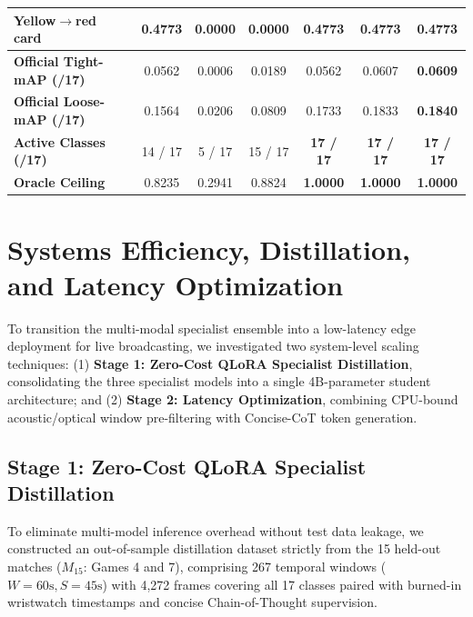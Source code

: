 \documentclass[10pt,twocolumn,letterpaper]{article}
\begin{document}
\begin{table}[t]
{\begin{tabular}{@{}lcccccc@{}}
Yellow$\to$red card & \textbf{0.4773} & 0.0000 & 0.0000 & 0.4773 & \textbf{0.4773} & \textbf{0.4773} \\
\midrule
\textbf{Official Tight-mAP (/17)} & 0.0562 & 0.0006 & 0.0189 & 0.0562 & 0.0607 & \textbf{0.0609} \\
\textbf{Official Loose-mAP (/17)} & 0.1564 & 0.0206 & 0.0809 & 0.1733 & 0.1833 & \textbf{0.1840} \\
\textbf{Active Classes (/17)} & 14 / 17 & 5 / 17 & 15 / 17 & \textbf{17 / 17} & \textbf{17 / 17} & \textbf{17 / 17} \\
\textbf{Oracle Ceiling} & 0.8235 & 0.2941 & 0.8824 & \textbf{1.0000} & \textbf{1.0000} & \textbf{1.0000} \\
\bottomrule
\end{tabular}%
}
\end{table}

\section{Systems Efficiency, Distillation, and Latency Optimization}
\label{sec:systems_efficiency}

To transition the multi-modal specialist ensemble into a low-latency edge deployment for live broadcasting, we investigated two system-level scaling techniques: (1) \textbf{Stage 1: Zero-Cost QLoRA Specialist Distillation}, consolidating the three specialist models into a single 4B-parameter student architecture; and (2) \textbf{Stage 2: Latency Optimization}, combining CPU-bound acoustic/optical window pre-filtering with Concise-CoT token generation.

\subsection{Stage 1: Zero-Cost QLoRA Specialist Distillation}
To eliminate multi-model inference overhead without test data leakage, we constructed an out-of-sample distillation dataset strictly from the 15 held-out matches ($M_{15}$: Games 4 and 7), comprising 267 temporal windows ($W=60\text{s}, S=45\text{s}$) with 4,272 frames covering all 17 classes paired with burned-in wristwatch timestamps and concise Chain-of-Thought supervision. 
\end{document}
